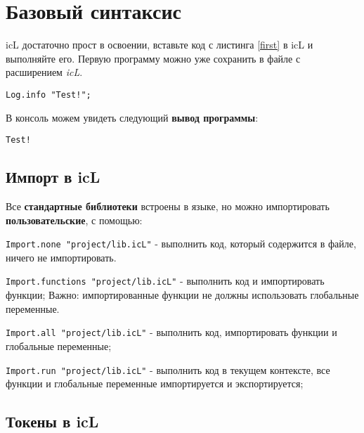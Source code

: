

\section{Базовый синтаксис}

icL достаточно прост в освоении, вставьте код с листинга \ref{first} в icL и выполняйте его. Первую программу можно уже сохранить в файле с расширением \textit{icL}.

\begin{sourcecode}
\label{first}
\begin{verbatim}
Log.info "Test!";
\end{verbatim}
\end{sourcecode}

В консоль можем увидеть следующий \textbf{вывод программы}:

\begin{verbatim}
Test!
\end{verbatim}

\subsection{Импорт в icL}

Все \textbf{стандартные библиотеки} встроены в языке, но можно импортировать \textbf{пользовательские}, с помощью:

\begin{icItems}
\item
	\texttt{Import.none "project/lib.icL"} - выполнить код, который содержится в файле, ничего не импортировать.
\item
	\texttt{Import.functions "project/lib.icL"} - выполнить код и импортировать функции; {\color{red}Важно:} импортированные функции не должны использовать глобальные переменные.
\item
	\texttt{Import.all "project/lib.icL"} -  выполнить код, импортировать функции и глобальные переменные;
\item
	\texttt{Import.run "project/lib.icL"} - выполнить код в текущем контексте, все функции и глобальные переменные импортируется и экспортируется;
\end{icItems}

\subsection{Токены в icL}

